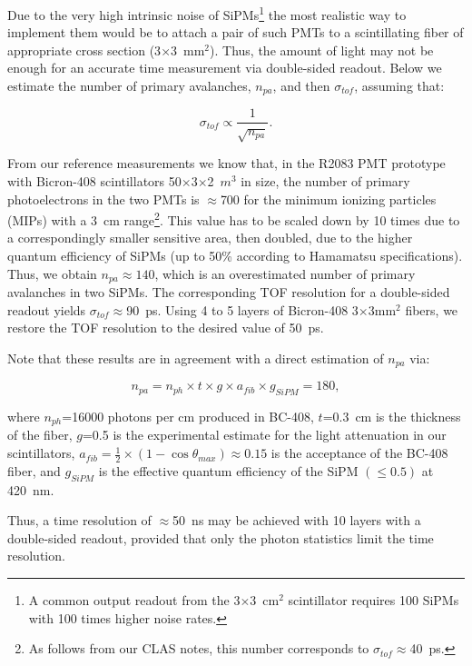 \documentclass[12pt]{article}
\begin{document}
Due to the very high intrinsic noise of SiPMs\footnote{A common output 
readout from the 3$\times$3~cm$^2$ scintillator requires 100 SiPMs with 100 
times higher noise rates.} the most realistic way to implement them would
be to attach a pair of such PMTs to a scintillating fiber of appropriate 
cross section (3$\times$3~mm$^2$).  Thus, the amount of light may not be 
enough for an accurate time measurement via double-sided readout.  Below we  
estimate the number of primary avalanches, $n_{pa}$, and then $\sigma_{tof}$, 
assuming that:

\begin{equation}
\sigma_{tof} \propto \frac{1}{\sqrt{n_{pa}}}.
\end{equation}

From our reference measurements we know that, in the R2083 PMT prototype with 
Bicron-408 scintillators 50$\times$3$\times$2~$m^3$ in size, the number of
 primary photoelectrons in the two PMTs is $\approx$700 for the minimum
ionizing particles (MIPs) with a 3~cm range\footnote{As follows from our 
CLAS notes, this number corresponds to $\sigma_{tof}\approx$40~ps.}.  This 
value has to be scaled down by 10 times due to a correspondingly smaller 
sensitive area, then doubled, due to the higher quantum efficiency of SiPMs
(up to 50\% according to Hamamatsu specifications).  Thus, we obtain 
$n_{pa}\approx 140$, which is an overestimated number of primary avalanches
in two SiPMs.  The corresponding TOF resolution for a double-sided readout 
yields $\sigma_{tof}\approx$90~ps.  Using 4 to 5 layers of Bicron-408 
3$\times$3mm$^2$ fibers, we restore the TOF resolution to the desired value 
of 50~ps.   

Note that these results are in agreement with a direct estimation of $n_{pa}$
via:

\begin{equation}
n_{pa}=n_{ph} \times t \times g \times a_{fib} \times g_{SiPM}=180,
\end{equation}

\noindent
where $n_{ph}$=16000 photons per cm produced in BC-408, $t$=0.3~cm is the
thickness of the fiber, $g$=0.5 is the experimental estimate for the 
light attenuation in our scintillators,
$a_{fib}=\frac{1}{2}\times(1-\cos\theta_{max})\approx0.15$ is the acceptance
of the BC-408 fiber, and $g_{SiPM}$ is the effective quantum efficiency of 
the SiPM $(\leq 0.5)$ at 420~nm. 

Thus, a time resolution of $\approx$50~ns may be achieved with 10 layers 
with a double-sided readout, provided that only the photon statistics limit 
the time resolution.
\end{document}
